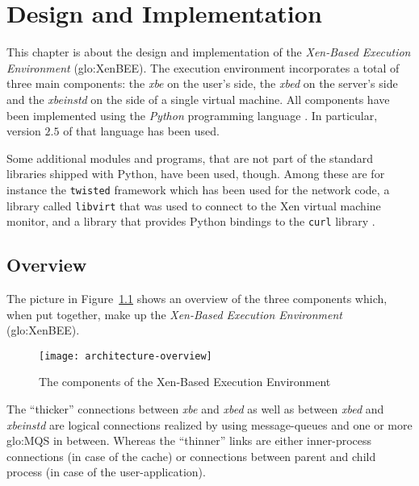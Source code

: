 
\chapter{Design and Implementation}
\label{cha:design}

This chapter is about the design and implementation of the \emph{Xen-Based
  Execution  Environment} (\gls{glo:XenBEE}).   The  execution environment
incorporates  a total  of three  main  components: the  \emph{xbe} on  the
user's side, the \emph{xbed} on  the server's side and the \emph{xbeinstd}
on  the  side of  a  single virtual  machine.   All  components have  been
implemented     using    the     \emph{Python}     programming    language
\cite{python-language}. In particular, version  $2.5$ of that language has
been used.

Some additional  modules and programs, that  are not part  of the standard
libraries shipped with Python, have been used, though. Among these are for
instance  the \texttt{twisted}  framework \cite{twisted-python}  which has
been  used  for  the  network  code,  a  library  called  \texttt{libvirt}
\cite{libvirt}  that  was used  to  connect  to  the Xen  virtual  machine
monitor, and a library that  provides Python bindings to the \texttt{curl}
library \cite{pycurl}.


\section{Overview}
\label{sec:design:overview}

The picture in Figure~\ref{fig:architecture-overview} shows an overview of
the three components which, when put together, make up the \emph{Xen-Based
  Execution  Environment} (\gls{glo:XenBEE}).

\begin{figure}[ht]
  \centering
  \texttt{[image: architecture-overview]}
  \caption[Overview of the  \gls{glo:XenBEE} components]{The components of
    the Xen-Based Execution Environment}
  \label{fig:architecture-overview}
\end{figure}

The ``thicker'' connections between  \emph{xbe} and \emph{xbed} as well as
between \emph{xbed}  and \emph{xbeinstd} are  logical connections realized
by using message-queues and one or more \gls{glo:MQS} in between.  Whereas
the ``thinner'' links are either inner-process connections (in case of the
cache) or  connections between  parent and child  process (in case  of the
user-application).

